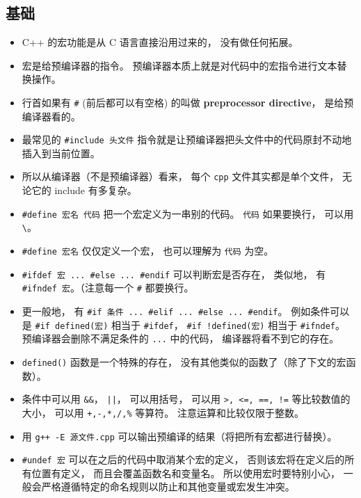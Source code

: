
\begin{issues}
\issueDraft
\end{issues}


\subsection{基础}
\begin{itemize}
\item C++ 的宏功能是从 C 语言直接沿用过来的， 没有做任何拓展。
\item 宏是给预编译器的指令。 预编译器本质上就是对代码中的宏指令进行文本替换操作。
\item 行首如果有 \verb|#| (前后都可以有空格) 的叫做 \textbf{preprocessor directive}， 是给预编译器看的。
\item 最常见的 \verb|#include 头文件| 指令就是让预编译器把头文件中的代码原封不动地插入到当前位置。
\item 所以从编译器（不是预编译器）看来， 每个 \verb|cpp| 文件其实都是单个文件， 无论它的 include 有多复杂。
\item \verb|#define 宏名 代码| 把一个宏定义为一串别的代码。 \verb|代码| 如果要换行， 可以用 \verb|\|。
\item \verb|#define 宏名| 仅仅定义一个宏， 也可以理解为 \verb|代码| 为空。
\item \verb|#ifdef 宏 ... #else ... #endif| 可以判断宏是否存在， 类似地， 有 \verb|#ifndef 宏|。（注意每一个 \verb|#| 都要换行。
\item 更一般地， 有 \verb|#if 条件 ... #elif ... #else ... #endif|。 例如条件可以是 \verb|#if defined(宏)| 相当于 \verb|#ifdef|， \verb|#if !defined(宏)| 相当于 \verb|#ifndef|。 预编译器会删除不满足条件的 \verb|...| 中的代码， 编译器将看不到它的存在。
\item \verb|defined()| 函数是一个特殊的存在， 没有其他类似的函数了（除了下文的宏函数）。
\item 条件中可以用 \verb|&&|， \verb`||`， 可以用括号， 可以用 \verb|>, <=, ==, !=| 等比较数值的大小， 可以用 \verb|+,-,*,/,%| 等算符。 注意运算和比较仅限于整数。
\item 用 \verb|g++ -E 源文件.cpp| 可以输出预编译的结果（将把所有宏都进行替换）。
\item \verb|#undef 宏| 可以在之后的代码中取消某个宏的定义， 否则该宏将在定义后的所有位置有定义， 而且会覆盖函数名和变量名。 所以使用宏时要特别小心， 一般会严格遵循特定的命名规则以防止和其他变量或宏发生冲突。

\end{itemize}
